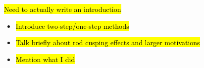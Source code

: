\hl{Need to actually write an introduction}

\begin{itemize}
\item \hl{Introduce two-step/one-step methods}
\item \hl{Talk briefly about rod cusping effects and larger motivations}
\item \hl{Mention what I did}
\end{itemize}
